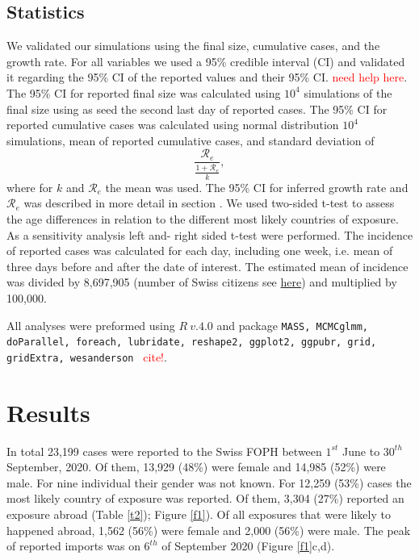 \documentclass[10pt, a4paper, twoside]{article}
\begin{document}
\begin{multicols}{2}
\subsection{Statistics}
We validated our simulations using the final size, cumulative cases, and the growth rate.
For all variables we used a 95\% credible interval (CI) and validated it regarding the 95\% CI of the reported values and their 95\% CI. \textcolor{red}{need help here}.
The 95\% CI for reported final size was calculated using $10^4$ simulations of the final size using as seed the second last day of reported cases.
The 95\% CI for reported cumulative cases was calculated using normal distribution $10^4$ simulations, mean of reported cumulative cases, and standard deviation of 
\[ \frac{\mathcal{R}_e}{\frac{1+ \mathcal{R}_e} {k}},\]
where for $k$ and $\mathcal{R}_e$ the mean was used.
The 95\% CI for inferred growth rate and $\mathcal{R}_e$ was described in more detail in section .
We used two-sided t-test to assess the age differences in relation to the different most likely countries of exposure.
As a sensitivity analysis left and- right sided t-test were performed.
The incidence of reported cases was calculated for each day, including one week, i.e. mean of three days before and after the date of interest.
The estimated mean of incidence was divided by 8,697,905 (number of Swiss citizens see \href{https://www.worldometers.info/world-population/switzerland-population/}{here}) and multiplied by 100,000.

All analyses were preformed using $R ~v.4.0$ and package \texttt{MASS, MCMCglmm, doParallel, foreach, lubridate, reshape2, ggplot2, ggpubr, grid, gridExtra, wesanderson } \textcolor{red}{cite!}.\cite{r_core_team_r_2020,venables_modern_2002}

\section{Results}
In total 23,199 cases were reported to the Swiss FOPH between $1^{st}$ June to $30^{th}$ September, 2020. 
Of them, 13,929 (48\%) were female and 14,985 (52\%) were male.
For nine individual their gender was not known.
For 12,259 (53\%) cases the most likely country of exposure was reported.
Of them, 3,304 (27\%) reported an exposure abroad (Table \ref{t2}); Figure \ref{f1}).
Of all exposures that were likely to happened abroad, 1,562 (56\%) were female and 2,000 (56\%) were male.
The peak of reported imports was on $6^{th}$ of September 2020 (Figure \ref{f1}c,d).


\end{multicols}
\end{document}
